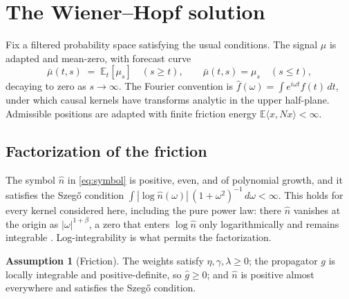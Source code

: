 \documentclass[11pt]{article}
\newcommand{\E}{\mathbb{E}}
\theoremstyle{plain}
\theoremstyle{definition}
\newtheorem{assumption}{Assumption}
\theoremstyle{remark}
\begin{document}
\section{The Wiener--Hopf solution}\label{sec:interior}

Fix a filtered probability space satisfying the usual conditions. The signal $\mu$ is adapted and mean-zero, with forecast curve
\[
\bar\mu(t,s) \;=\; \E_t[\mu_s] \quad (s\ge t), \qquad \bar\mu(t,s)=\mu_s \quad (s\le t),
\]
decaying to zero as $s\to\infty$. The Fourier convention is $\hat f(\omega)=\int e^{i\omega t}f(t)\,dt$, under which causal kernels have transforms analytic in the upper half-plane. Admissible positions are adapted with finite friction energy $\E\langle x,Nx\rangle<\infty$.

\subsection{Factorization of the friction}\label{sec:factor}

The symbol $\hat n$ in \eqref{eq:symbol} is positive, even, and of polynomial growth, and it satisfies the Szeg\H{o} condition $\int|\log\hat n(\omega)|\,(1+\omega^2)^{-1}\,d\omega<\infty$. This holds for every kernel considered here, including the pure power law: there $\hat n$ vanishes at the origin as $|\omega|^{1+\beta}$, a zero that enters $\log\hat n$ only logarithmically and remains integrable \citep{Krein1962}. Log-integrability is what permits the factorization.

\begin{assumption}[Friction]\label{ass:friction}
The weights satisfy $\eta,\gamma,\lambda\ge0$; the propagator $g$ is locally integrable and positive-definite, so $\hat g\ge0$; and $\hat n$ is positive almost everywhere and satisfies the Szeg\H{o} condition.
\end{assumption}
\end{document}
